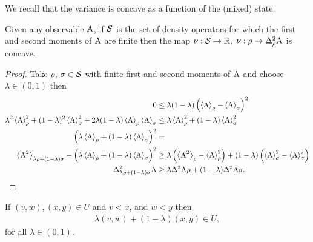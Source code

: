 We recall that the variance is concave as a function of the (mixed) state.
\begin{lem}\label{lem:box-ur-variance-concave}
  Given any observable $\operatorname{A}$, if $\dops$ is the set of density operators for which the first and second moments of $\operatorname{A}$ are finite then the map $\nu:\dops\to \R$, $\nu:\rho\mapsto \varr{\opa}$ is concave.
\end{lem}
\begin{proof}
  Take $\rho,\, \sigma \in \dops$ with finite first and second moments of $\operatorname{A}$ and choose $\lambda \in (0,1)$ then
  \begin{align}
    0&\leq \lambda(1-\lambda) \left(\expe{\opa}{\rho} - \expe{\opa}{\sigma}\right)^2\\
    \lambda^2 \expe{\opa}{\rho}^2 + (1- \lambda)^2\expe{\opa}{\sigma}^2 + 2\lambda(1-\lambda)\expe{\opa}{\rho}\expe{\opa}{\sigma} &\leq \lambda \expe{\opa}{\rho}^2 + (1-\lambda) \expe{\opa}{\sigma}^2\\
    \left(\lambda \expe{\opa}{\rho} + (1- \lambda)\expe{\opa}{\sigma}\right)^2 &=\\
    \expe{\opa^2}{\lambda\rho + (1-\lambda)\sigma} - \left(\lambda \expe{\opa}{\rho} + (1- \lambda)\expe{\opa}{\sigma}\right)^2 &\geq \lambda\left(\expe{\opa^2}{\rho} -\expe{\opa}{\rho}^2\right) + (1-\lambda)\left(\expe{\opa}{\sigma}^2 -\expe{\opa}{\sigma}^2\right)\\
    \var[\lambda\rho + (1-\lambda)\sigma]{\opa} &\geq \lambda \var{\opa}{\rho} + (1-\lambda) \var{\opa}{\sigma}.
  \end{align}
\end{proof}
\begin{lem}\label{lem:increasing-line-segments-contained}
  If $(v,w), (x,y)\in U$ and $v<x$, and $w < y$ then 
  \begin{align}
    \lambda(v,w) + (1-\lambda)(x,y)\in U,
  \end{align}
  for all $\lambda\in (0,1)$.
\end{lem}
